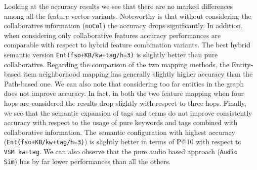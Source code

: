 Looking at the accuracy results we see that there are no marked differences among all the feature vector variants. Noteworthy is that without considering the collaborative information (\texttt{noCol}) the accuracy drops significantly. In addition, when considering only collaborative features accuracy performances are comparable with respect to hybrid feature combination variants. The best hybrid semantic version \texttt{Ent(fso+KB/kw+tag/h=3)} is slightly better than pure collaborative.%
Regarding the comparison of the two mapping methods, the Entity-based item neighborhood mapping has generally slightly higher accuracy than the Path-based one. We can also note that considering too far entities in the graph does not improve accuracy. In fact, in both the two feature mapping when four hops are considered the results drop slightly with respect to three hops. 
Finally, we see that the semantic expansion of tags and terms do not improve consistently accuracy with respect to the usage of pure keywords and tags combined with collaborative information. The semantic configuration with highest accuracy (\texttt{Ent(fso+KB/kw+tag/h=3)}) is slightly better in terms of P@10 with respect to  \texttt{VSM kw+tag}. We can also observe that the pure audio based approach (\texttt{Audio Sim}) has by far lower performances than all the others. %

